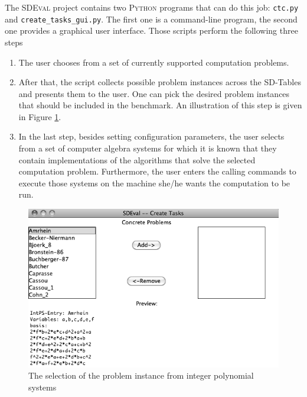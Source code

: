 \documentclass[12pt]{article}
\begin{document}
The \textsc{SDEval} project contains two \textsc{Python} programs that can do
this job: \texttt{ctc.py} and \texttt{create\_{\allowbreak}tasks\_gui.py}.  The
first one is a command-line program, the second one provides a graphical user
interface.  Those scripts perform the following three steps
\begin{enumerate}
\item The user chooses from a set of currently supported computation problems.

  
\item After that, the script collects possible problem instances across the
  SD-Tables and presents them to the user. One can pick the desired problem
  instances that should be included in the benchmark. An illustration of this
  step is given in Figure \ref{fgr:selectPI}.
\item In the last step, besides setting configuration parameters, the user
  selects from a set of computer algebra systems for which it is known that
  they contain implementations of the algorithms that solve the selected
  computation problem. Furthermore, the user enters the calling commands to
  execute those systems on the machine she/he wants the computation to be run.
\end{enumerate}

\begin{figure}
\caption{The selection of the problem instance from integer polynomial systems}
\label{fgr:selectPI}
\begin{center}
\includegraphics[width=.5\textwidth]{problemSelectionWindow.png}
\end{center}
\end{figure}
\end{document}
